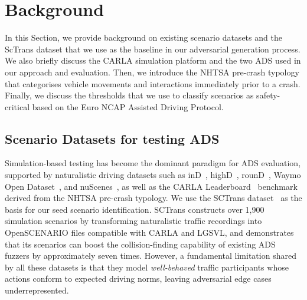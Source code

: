 \section{Background}

In this Section, we provide background on existing scenario datasets and the ScTrans dataset that we use as the baseline in our adversarial generation process. We also briefly discuss the CARLA simulation platform and the two ADS used in our approach and evaluation. Then, we introduce the NHTSA pre-crash typology that categorises vehicle movements and interactions immediately prior to a crash. Finally, we discuss the thresholds that we use to classify scenarios as safety-critical based on the Euro NCAP Assisted Driving Protocol. 
\subsection{Scenario Datasets for testing ADS}\label{sec:scenario_based_testing}

Simulation-based testing has become the dominant paradigm for ADS evaluation, supported by naturalistic driving datasets such as inD~\cite{bock_ind_2020}, highD~\cite{krajewski_highd_2018}, rounD~\cite{krajewski_round_2020}, Waymo Open Dataset~\cite{sun_scalability_2020}, and nuScenes~\cite{caesar_nuscenes_2020}, as well as the CARLA Leaderboard~\cite{noauthor_carla_nodate} benchmark derived from the NHTSA pre-crash typology. We use the SCTrans dataset~\cite{dai_sctrans_2024} as the basis for our seed scenario identification. SCTrans constructs over 1,900 simulation scenarios by transforming naturalistic traffic recordings into OpenSCENARIO files compatible with CARLA and LGSVL, and demonstrates that its scenarios can boost the collision-finding capability of existing ADS fuzzers by approximately seven times. However, a fundamental limitation shared by all these datasets is that they model \textit{well-behaved} traffic participants whose actions conform to expected driving norms, leaving adversarial edge cases underrepresented.

